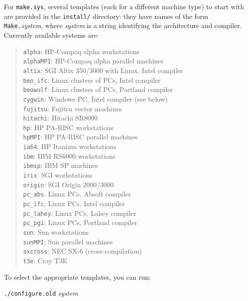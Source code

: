 \documentclass[12pt,a4paper]{article}
\begin{document}
For \texttt{make.sys}, several templates (each for a different machine
type) to start with are provided in the \texttt{install/} directory:
they have names of the form \texttt{Make.}\emph{system}, where
\emph{system} is a string identifying the architecture and compiler.
Currently available systems are:
\begin{quote}
  \texttt{alpha}:     HP-Compaq alpha workstations\\
  \texttt{alphaMPI}:  HP-Compaq alpha parallel machines\\
  \texttt{altix}:     SGI Altix 350/3000 with Linux, Intel compiler\\
  \texttt{beo\_ifc}:  Linux clusters of PCs, Intel compiler\\
  \texttt{beowulf}:   Linux clusters of PCs, Portland compiler\\
  \texttt{cygwin}:    Windows PC, Intel compiler (see below)\\
  \texttt{fujitsu}:   Fujitsu vector machines\\
  \texttt{hitachi}:   Hitachi SR8000\\
  \texttt{hp}:        HP PA-RISC workstations\\
  \texttt{hpMPI}:     HP PA-RISC parallel machines\\
  \texttt{ia64}:      HP Itanium workstations\\
  \texttt{ibm}:       IBM RS6000 workstations\\
  \texttt{ibmsp}:     IBM SP machines\\
  \texttt{irix}:      SGI workstations\\
  \texttt{origin}:    SGI Origin 2000/3000\\
  \texttt{pc\_abs}:   Linux PCs, Absoft compiler\\
  \texttt{pc\_ifc}:   Linux PCs, Intel compiler\\
  \texttt{pc\_lahey}: Linux PCs, Lahey compiler\\
  \texttt{pc\_pgi}:   Linux PCs, Portland compiler\\
  \texttt{sun}:       Sun workstations\\
  \texttt{sunMPI}:    Sun parallel machines\\
  \texttt{sxcross}:   NEC SX-6 (cross-compilation)\\
  \texttt{t3e}:       Cray T3E
\end{quote}
To select the appropriate templates, you can run:
\medskip

\texttt{./configure.old} \emph{system}
\medskip
\end{document}
